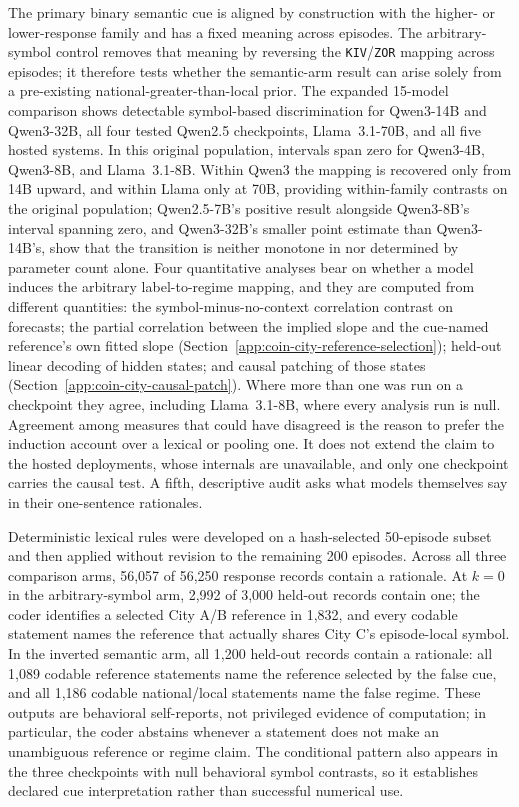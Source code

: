 The primary binary semantic cue is aligned by construction with the higher- or
lower-response family and has a fixed meaning across episodes. The arbitrary-symbol
control removes that meaning by reversing the \texttt{KIV}/\texttt{ZOR} mapping
across episodes; it therefore tests whether the semantic-arm result can arise
solely from a pre-existing national-greater-than-local prior. The expanded
15-model comparison shows detectable symbol-based discrimination for Qwen3-14B
and Qwen3-32B, all four tested Qwen2.5 checkpoints, Llama~3.1-70B, and all five
hosted systems.
In this original population, intervals span zero for Qwen3-4B, Qwen3-8B, and
Llama~3.1-8B. Within Qwen3 the mapping is recovered only from 14B upward, and
within Llama only at 70B,
providing within-family contrasts on the original population; Qwen2.5-7B's positive
result alongside Qwen3-8B's interval spanning zero, and Qwen3-32B's smaller
point estimate than Qwen3-14B's, show that the transition is neither monotone in
nor determined by parameter count alone.
Four quantitative analyses bear on whether a model induces the arbitrary
label-to-regime mapping, and they are computed from different quantities: the
symbol-minus-no-context correlation contrast on forecasts; the partial correlation
between the implied slope and the cue-named reference's own fitted slope
(Section~\ref{app:coin-city-reference-selection}); held-out linear decoding of
hidden states; and causal patching of those states
(Section~\ref{app:coin-city-causal-patch}). Where more than one was run on a
checkpoint they agree, including Llama~3.1-8B, where every analysis run is null.
Agreement among measures that could have disagreed is the reason to prefer the
induction account over a lexical or pooling one. It does not extend the claim to
the hosted deployments, whose internals are unavailable, and only one checkpoint
carries the causal test. A fifth, descriptive audit asks what models themselves
say in their one-sentence rationales.

Deterministic lexical rules were developed on a hash-selected 50-episode subset and
then applied without revision to the remaining
200 episodes. Across all three comparison arms, 56,057 of 56,250 response records
contain a rationale. At $k=0$ in the arbitrary-symbol arm, 2,992 of 3,000 held-out
records contain one; the coder identifies a selected City A/B reference in 1,832,
and every codable statement names the reference that actually shares City C's
episode-local symbol. In the inverted semantic arm, all 1,200 held-out records
contain a rationale: all 1,089 codable reference statements name the reference
selected by the false cue, and all 1,186 codable national/local statements name
the false regime. These outputs are behavioral self-reports, not privileged
evidence of computation; in particular, the coder abstains whenever a statement
does not make an unambiguous reference or regime claim. The conditional pattern
also appears in the three checkpoints with null behavioral symbol contrasts, so
it establishes declared cue interpretation rather than successful numerical use.

